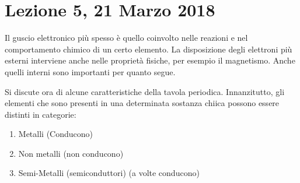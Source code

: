 \documentclass[../AppuntiChimica]{subfiles}
\begin{document}
	\section{Lezione 5, 21 Marzo 2018}
	Il guscio elettronico più spesso è quello coinvolto nelle reazioni e nel comportamento chimico di un certo elemento. La disposizione degli elettroni più esterni interviene anche nelle proprietà fisiche, per esempio il magnetismo. Anche quelli interni sono importanti per quanto segue. 
	
	Si discute ora di alcune caratteristiche della tavola periodica. Innanzitutto, gli elementi che sono presenti in una determinata sostanza chiica possono essere distinti in categorie:
	\begin{enumerate}
		\item Metalli (Conducono)
		\item Non metalli (non conducono)
		\item Semi-Metalli (semiconduttori) (a volte conducono)
	\end{enumerate}
\end{document}
